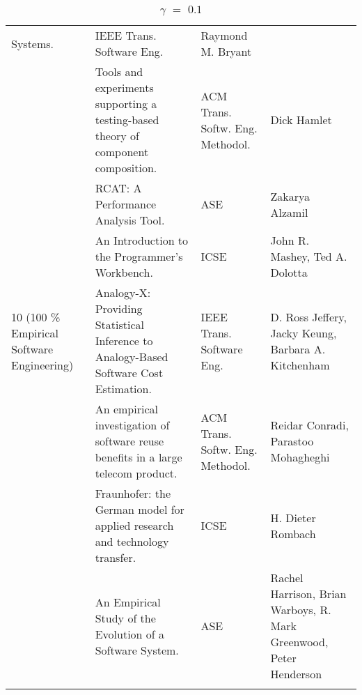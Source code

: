 \begin{center}
\begin{longtable}{|p{}p{}p{}p{}|}
Systems.& IEEE Trans. 
Software Eng.& Raymond M. Bryant \\
\rowcolor{black!20}	& Tools and experiments supporting a testing-based theory of component 
composition.& ACM Trans. Softw. Eng. Methodol.& Dick Hamlet \\
	& RCAT: A Performance Analysis Tool.& ASE& Zakarya Alzamil \\
\rowcolor{black!20}	& An Introduction to the Programmer's Workbench.& ICSE& John R. Mashey, Ted 
A. Dolotta \\
    10 (100 \% Empirical Software Engineering) & Analogy-X: Providing Statistical Inference to 
Analogy-Based Software Cost Estimation.& 
IEEE Trans. Software Eng.& D. Ross Jeffery, Jacky Keung, Barbara A. Kitchenham \\
\rowcolor{black!20}	& An empirical investigation of software reuse benefits in a large telecom 
product.& ACM Trans. Softw. Eng. Methodol.& Reidar Conradi, Parastoo Mohagheghi \\
	& Fraunhofer: the German model for applied research and technology transfer.& ICSE& H. 
Dieter Rombach \\
\rowcolor{black!20}	& An Empirical Study of the Evolution of a Software System.& ASE& Rachel 
Harrison, Brian Warboys, R. Mark Greenwood, Peter Henderson \\
    \hline
    \caption {$\gamma$ $=$ $0.1$}
\end{longtable}
\end{center}